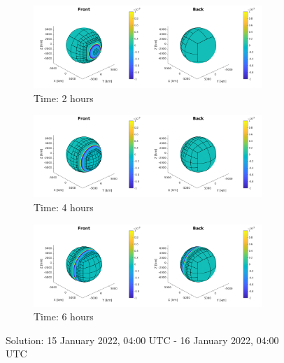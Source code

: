 \documentclass[twoside]{bsu-ms}
\begin{document}
\begin{figure}[!htbp]\ContinuedFloat
\vspace{-15pt}
\centering
\begin{subfigure}{\textwidth}
  \centering
  \includegraphics[width=0.95\textwidth,clip=True,trim=4cm 0cm 4cm 0cm]{images/ideal/ideal_4.png}
  \caption{Time: 2 hours }
\end{subfigure}

\medskip

\begin{subfigure}{\textwidth}
  \centering
  \includegraphics[width=0.95\textwidth,clip=True,trim=4cm 0cm 4cm 0cm]{images/ideal/ideal_8.png}
  \caption{Time: 4 hours }
\end{subfigure}

\medskip

\begin{subfigure}{\textwidth}
  \centering
  \includegraphics[width=0.95\textwidth,clip=True,trim=4cm 0cm 4cm 0cm]{images/ideal/ideal_12.png}
  \caption{Time: 6 hours }
\end{subfigure}

\caption{Solution: 15 January 2022, 04:00 $\mathrm{UTC}$ - 16 January 2022, 04:00 $\mathrm{UTC}$}
\end{figure}
\end{document}
